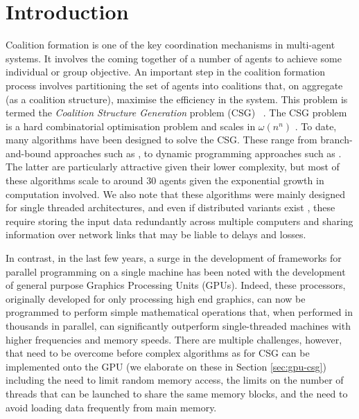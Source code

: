 \documentclass{llncs}
\begin{document}
\section{Introduction}
\noindent Coalition formation is one of the key coordination mechanisms in
multi-agent systems. It involves the coming together of a number of  agents to
achieve some individual or group objective.  An important step in the 
 coalition formation process involves partitioning the set of agents into coalitions that, on aggregate (as a coalition structure), maximise the efficiency in the system. This problem is termed the 
\emph{Coalition Structure Generation} problem (CSG)
~\cite{DBLP:journals/ai/SandholmLAST99}.   The  CSG problem is a hard combinatorial optimisation problem and scales in $\omega(n^n)$ \cite{DBLP:journals/ai/SandholmLAST99}. To date, many algorithms have been designed to solve the CSG. These range from branch-and-bound approaches such as \cite{rahwan2009anytime}, to dynamic programming approaches such as
\cite{DBLP:conf/atal/RahwanJ08,rahwan:jennings:2008b}. The latter are particularly attractive given their lower complexity, but most of these algorithms scale to around 30 agents given the exponential growth in computation involved. We also note that these algorithms were mainly designed for single threaded architectures, and even if distributed variants exist \cite{michalak2010distributed}, these require storing the input data redundantly across multiple computers and sharing information over network links that may be liable to delays and losses. 

In contrast, in the last few years, a surge in the development of frameworks for parallel programming on a single machine has been noted with the development of general purpose Graphics Processing Units (GPUs). Indeed, these processors, originally developed for only processing high end graphics, can now be programmed to perform simple mathematical operations that, when performed in thousands in parallel, can significantly outperform single-threaded machines with higher frequencies and memory speeds. There are multiple challenges, however, that need to be overcome before complex algorithms as for CSG can be implemented onto the GPU (we elaborate on these in Section \ref{sec:gpu-csg}) including the need to limit random memory access,  the limits on the number of threads that can be launched to share the same memory blocks, and the need to avoid loading data frequently from main memory. 
\end{document}
